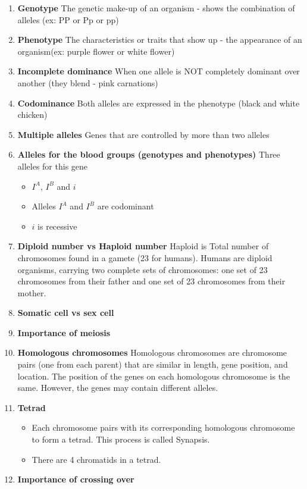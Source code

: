 \documentclass[9pt]{article}
\begin{document}
\begin{enumerate}
\item {\bf Genotype} The genetic make-up of an organism  -  shows the
  combination of alleles (ex: PP or Pp or pp)
\item {\bf Phenotype} The characteristics or traits that show up - the
  appearance of an organism(ex: purple flower or white flower)
\item {\bf Incomplete dominance} When one allele is NOT completely
  dominant over another (they blend - pink carnations)
\item {\bf Codominance} Both alleles are expressed in the phenotype
  (black and white chicken)
\item {\bf Multiple alleles} Genes that are controlled by more than
  two alleles
\item {\bf Alleles for the blood groups (genotypes and phenotypes)}
  Three alleles for this gene
  \begin{itemize}
    \item $I^A$, $I^B$ and $i$
    \item Alleles $I^A$ and $I^B$ are codominant
    \item $i$ is recessive
  \end{itemize}
\item {\bf Diploid number vs Haploid number} Haploid is Total number
  of chromosomes found in a gamete (23 for humans). Humans are diploid
  organisms, carrying two complete sets of chromosomes: one set of 23
  chromosomes from their father and one set of 23 chromosomes from
  their mother.
\item {\bf Somatic cell vs sex cell}
\item {\bf Importance of meiosis}
\item {\bf Homologous chromosomes} Homologous chromosomes are
  chromosome pairs (one from each parent) that are similar in length,
  gene position, and location. The position of the genes on each
  homologous chromosome is the same. However, the genes may contain
  different alleles.
\item {\bf Tetrad}
  \begin{itemize}
    \item Each chromosome pairs with its corresponding homologous
      chromosome to form a tetrad. This process is called Synapsis.
    \item There are 4 chromatids in a tetrad.
  \end{itemize}
\item {\bf Importance of crossing over}
  \begin{itemize}

\end{itemize}
\end{enumerate}
\end{document}
